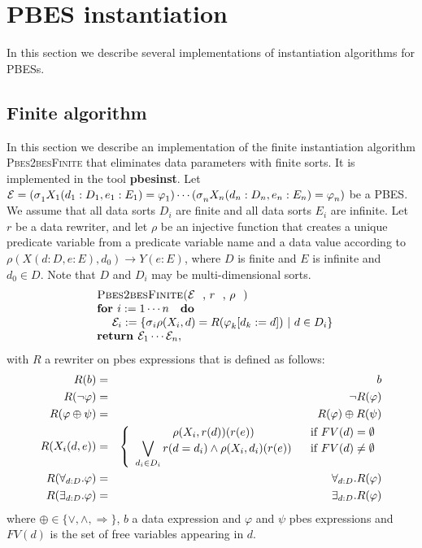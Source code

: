                       

\section{PBES instantiation}

In this section we describe several implementations of instantiation
algorithms for PBESs.

\subsection{Finite algorithm}

In this section we describe an implementation of the finite instantiation
algorithm \textsc{Pbes2besFinite} that eliminates data parameters with
finite sorts. It is implemented in the tool \textbf{pbesinst}. Let $\mathcal{%
E=(\sigma }_{1}X_{1}(d_{1}:D_{1},e_{1}:E_{1})=\varphi _{1})\cdots \mathcal{%
(\sigma }_{n}X_{n}(d_{n}:D_{n},e_{n}:E_{n})=\varphi _{n})$ be a PBES. We
assume that all data sorts $D_{i}$ are finite and all data sorts $E_{i}$ are
infinite. Let $r$ be a data rewriter, and let $\rho $ be an injective
function that creates a unique predicate variable from a predicate variable
name and a data value according to $\rho (X(d:D,e:E),d_{0})\rightarrow
Y(e:E) $, where $D$ is finite and $E$ is infinite and $d_{0}\in D$. Note
that $D$ and $D_{i}$ may be multi-dimensional sorts.%
\begin{equation*}
\begin{array}{l}
\text{\textsc{Pbes2besFinite(}}\mathcal{E}\text{, }r\text{, }\rho \text{%
\textsc{)}} \\ 
\text{\textbf{for }}i:=1\cdots n\text{ \textbf{do}} \\ 
\qquad \mathcal{E}_{i}:=\{\mathcal{\sigma }_{i}\rho (X_{i},d)=R(\varphi
_{k}[d_{k}:=d])\ |\ d\in D_{i}\} \\ 
\text{\textbf{return }}\mathcal{E}_{1}\cdots \mathcal{E}_{n},%
\end{array}%
\end{equation*}%
with $R$ a rewriter on pbes expressions that is defined as follows:%
\begin{eqnarray*}
R(b) &=&b \\
R(\lnot \varphi ) &=&\lnot R(\varphi ) \\
R(\varphi \oplus \psi ) &=&R(\varphi )\oplus R(\psi ) \\
R(X_{i}(d,e)) &=&\left\{ 
\begin{array}{cc}
\rho (X_{i},r(d))(r(e)) & \text{if }FV(d)=\emptyset \\ 
\dbigvee\limits_{d_{i}\in D_{i}}r(d=d_{i})\wedge \rho (X_{i},d_{i})(r(e)) & 
\text{if }FV(d)\neq \emptyset%
\end{array}%
\right. \\
R(\forall _{d:D}.\varphi ) &=&\forall _{d:D}.R(\varphi ) \\
R(\exists _{d:D}.\varphi ) &=&\exists _{d:D}.R(\varphi )
\end{eqnarray*}%
where $\oplus \in \{\vee ,\wedge ,\Rightarrow \}$, $b$ a data expression and 
$\varphi $ and $\psi $ pbes expressions and $FV(d)$ is the set of free
variables appearing in $d$.\newpage

